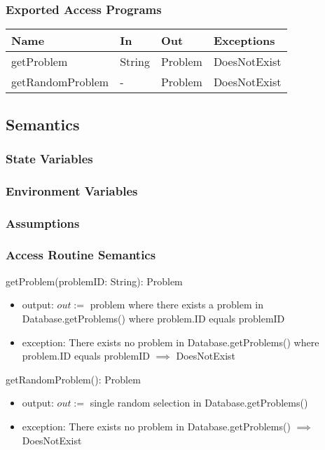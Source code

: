 \documentclass[12pt, titlepage]{article}
\begin{document}
\subsubsection{Exported Access Programs}

\begin{center}
\begin{tabular}{ |  p{4cm} | p{2cm} |  p{2cm} | p{3cm} | }
\hline
\textbf{Name} & \textbf{In} & \textbf{Out} & \textbf{Exceptions} \\
\hline
getProblem & String & Problem & DoesNotExist \\
getRandomProblem & -  & Problem & DoesNotExist \\
\hline
\end{tabular}
\end{center}

\subsection{Semantics}

\subsubsection{State Variables}

\subsubsection{Environment Variables}

\subsubsection{Assumptions}

\subsubsection{Access Routine Semantics}

\noindent getProblem(problemID: String): Problem
\begin{itemize}
\item output: $out := $ problem where there exists a problem in Database.getProblems() where problem.ID equals problemID
\item exception: There exists no problem in Database.getProblems() where problem.ID equals problemID $\implies$ DoesNotExist
\end{itemize}


\noindent getRandomProblem(): Problem
\begin{itemize}
\item output: $out := $ single random selection in Database.getProblems()
\item exception: There exists no problem in Database.getProblems() $\implies$ DoesNotExist
\end{itemize}
\end{document}
